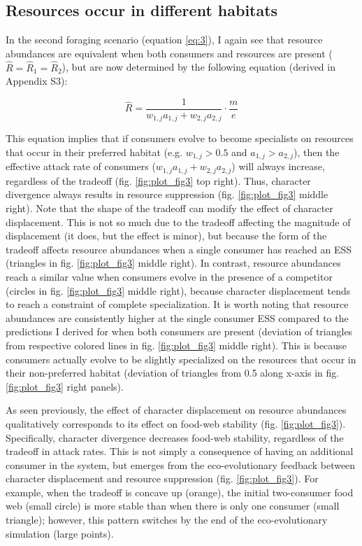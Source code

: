 \documentclass[11pt,]{article}
\begin{document}
\subsection{Resources occur in different
habitats}\label{resources-occur-in-different-habitats}

In the second foraging scenario (equation \ref{eq:3}), I again see that
resource abundances are equivalent when both consumers and resources are
present (\(\hat R = \hat R_1 = \hat R_2\)), but are now determined by
the following equation (derived in Appendix S3):

\begin{equation} \label{eq:6}
  \hat{R}=\frac{1}{w_{1,j}a_{1,j}+w_{2,j}a_{2,j}}\cdot\frac{m}{e}
\end{equation}

This equation implies that if consumers evolve to become specialists on
resources that occur in their preferred habitat (e.g. \(w_{1,j}>0.5\)
and \(a_{1,j}>a_{2,j}\)), then the effective attack rate of consumers
(\(w_{1,j}a_{1,j}+w_{2,j}a_{2,j}\)) will always increase, regardless of
the tradeoff (fig. \ref{fig:plot_fig3} top right). Thus, character
divergence always results in resource suppression (fig.
\ref{fig:plot_fig3} middle right). Note that the shape of the tradeoff
can modify the effect of character displacement. This is not so much due
to the tradeoff affecting the magnitude of displacement (it does, but
the effect is minor), but because the form of the tradeoff affects
resource abundances when a single consumer has reached an ESS (triangles
in fig. \ref{fig:plot_fig3} middle right). In contrast, resource
abundances reach a similar value when consumers evolve in the presence
of a competitor (circles in fig. \ref{fig:plot_fig3} middle right),
because character displacement tends to reach a constraint of complete
specialization. It is worth noting that resource abundances are
consistently higher at the single consumer ESS compared to the
predictions I derived for when both consumers are present (deviation of
triangles from respective colored lines in fig. \ref{fig:plot_fig3}
middle right). This is because consumers actually evolve to be slightly
specialized on the resources that occur in their non-preferred habitat
(deviation of triangles from 0.5 along x-axis in fig.
\ref{fig:plot_fig3} right panels).

As seen previously, the effect of character displacement on resource
abundances qualitatively corresponds to its effect on food-web stability
(fig. \ref{fig:plot_fig3}). Specifically, character divergence decreases
food-web stability, regardless of the tradeoff in attack rates. This is
not simply a consequence of having an additional consumer in the system,
but emerges from the eco-evolutionary feedback between character
displacement and resource suppression (fig. \ref{fig:plot_fig3}). For
example, when the tradeoff is concave up (orange), the initial
two-consumer food web (small circle) is more stable than when there is
only one consumer (small triangle); however, this pattern switches by
the end of the eco-evolutionary simulation (large points).
\end{document}
